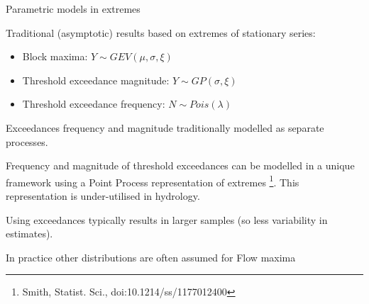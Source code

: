 \documentclass[
  10pt,
  ignorenonframetext,
  compress]{beamer}
\providecommand{\tightlist}{%
  \setlength{\itemsep}{0pt}\setlength{\parskip}{0pt}}
\begin{document}
\begin{frame}{Parametric models in extremes}
\protect\hypertarget{parametric-models-in-extremes}{}

Traditional (asymptotic) results based on extremes of stationary series:

\begin{itemize}
\tightlist
\item
  Block maxima: \(Y \sim GEV(\mu, \sigma, \xi)\)
\item
  Threshold exceedance magnitude: \(Y \sim GP(\sigma, \xi)\)
\item
  Threshold exceedance frequency: \(N \sim Pois(\lambda)\)
\end{itemize}

\pause

Exceedances frequency and magnitude traditionally modelled as separate
processes.

Frequency and magnitude of threshold exceedances can be modelled in a
unique framework using a Point Process representation of extremes
\footnote{Smith, Statist. Sci., doi:10.1214/ss/1177012400}. \pause This
representation is under-utilised in hydrology.

\pause  Using exceedances typically results in larger samples (so less
variability in estimates).

\pause

In practice other distributions are often assumed for Flow maxima

\end{frame}
\end{document}
